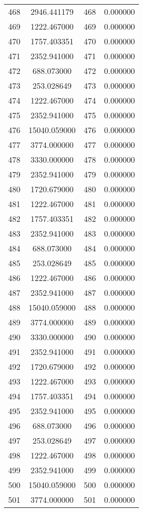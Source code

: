 \documentclass[12pt]{article}
\begin{document}
\begin{longtable}{@{}cccc@{}}
468 & 2946.441179 & 468 & 0.000000 \\
469 & 1222.467000 & 469 & 0.000000 \\
470 & 1757.403351 & 470 & 0.000000 \\
471 & 2352.941000 & 471 & 0.000000 \\
472 & 688.073000 & 472 & 0.000000 \\
473 & 253.028649 & 473 & 0.000000 \\
474 & 1222.467000 & 474 & 0.000000 \\
475 & 2352.941000 & 475 & 0.000000 \\
476 & 15040.059000 & 476 & 0.000000 \\
477 & 3774.000000 & 477 & 0.000000 \\
478 & 3330.000000 & 478 & 0.000000 \\
479 & 2352.941000 & 479 & 0.000000 \\
480 & 1720.679000 & 480 & 0.000000 \\
481 & 1222.467000 & 481 & 0.000000 \\
482 & 1757.403351 & 482 & 0.000000 \\
483 & 2352.941000 & 483 & 0.000000 \\
484 & 688.073000 & 484 & 0.000000 \\
485 & 253.028649 & 485 & 0.000000 \\
486 & 1222.467000 & 486 & 0.000000 \\
487 & 2352.941000 & 487 & 0.000000 \\
488 & 15040.059000 & 488 & 0.000000 \\
489 & 3774.000000 & 489 & 0.000000 \\
490 & 3330.000000 & 490 & 0.000000 \\
491 & 2352.941000 & 491 & 0.000000 \\
492 & 1720.679000 & 492 & 0.000000 \\
493 & 1222.467000 & 493 & 0.000000 \\
494 & 1757.403351 & 494 & 0.000000 \\
495 & 2352.941000 & 495 & 0.000000 \\
496 & 688.073000 & 496 & 0.000000 \\
497 & 253.028649 & 497 & 0.000000 \\
498 & 1222.467000 & 498 & 0.000000 \\
499 & 2352.941000 & 499 & 0.000000 \\
500 & 15040.059000 & 500 & 0.000000 \\
501 & 3774.000000 & 501 & 0.000000 \\

\end{longtable}
\end{document}
